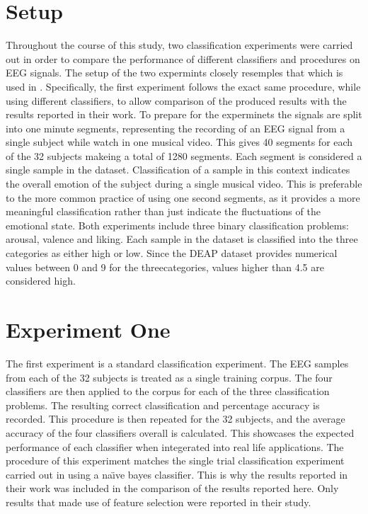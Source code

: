 \documentclass[12pt, a4paper, fleqn]{memoir}%
\begin{document}
\section{Setup}
\label{sec:setup}
Throughout the course of this study, two classification experiments were carried out in order to compare the performance of different classifiers and procedures on EEG signals. The setup of the two expermints closely resemples that which is used in \cite{koelstra2012deap}. Specifically, the first experiment follows the exact same procedure, while using different classifiers, to allow comparison of the produced results with the results reported in their work. To prepare for the experminets the signals are split into one minute segments, representing the recording of an EEG signal from a single subject while watch in one musical video. This gives 40 segments for each of the 32 subjects makeing a total of 1280 segments. Each segment is considered a single sample in the dataset. Classification of a sample in this context indicates the overall emotion of the subject during a single musical video. This is preferable to the more common practice of using one second segments, as it provides a more meaningful classification rather than just indicate the fluctuations of the  emotional state. Both experiments include three binary classification problems: arousal, valence and liking. Each sample in the dataset is classified into the three categories as either high or low. Since the DEAP dataset provides numerical values between 0 and 9 for the threecategories, values higher than 4.5 are considered high.

\section{Experiment One}
\label{sec:exp1}
The first experiment is a standard classification experiment. The EEG samples from each of the 32 subjects is treated as a single training corpus. The four classifiers are then applied to the corpus for each of the three classification problems. The resulting correct classification and percentage accuracy is recorded. This procedure is then repeated for the 32 subjects, and the average accuracy of the four classifiers overall is calculated. This showcases the expected performance of each classifier when integerated into real life applications. The procedure of this experiment matches the single trial classification experiment carried out in \cite{koelstra2012deap} using a na\"{\i}ve bayes classifier. This is why the results reported in their work was included in the comparison of the results reported here. Only results that made use of feature selection were reported in their study.
\end{document}
